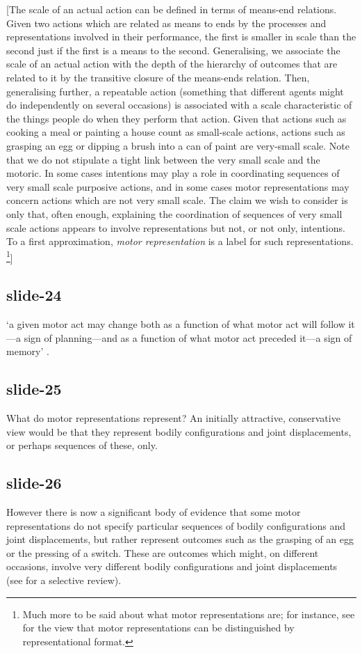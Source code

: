 \documentclass[12pt,\papersize]{extarticle}
\begin{document}
[The scale of an actual action can be defined in terms of means-end relations.
Given two actions which are related as means to ends by the processes and representations
involved in their performance, the first is smaller in scale than the second just if the
first is a means to the second. Generalising, we associate the scale of an actual action
with the depth of the hierarchy of outcomes that are related to it by the transitive closure
of the means-ends relation. Then, generalising further, a repeatable action (something that
different agents might do independently on several occasions) is associated with a scale
characteristic of the things people do when they perform that action. Given that actions
such as cooking a meal or painting a house count as small-scale actions, actions such as
grasping an egg or dipping a brush into a can of paint are very-small scale. Note that we
do not stipulate a tight link between the very small scale and the motoric. In some cases
intentions may play a role in coordinating sequences of very small scale purposive actions,
and in some cases motor representations may concern actions which are not very small scale.
The claim we wish to consider is only that, often enough, explaining the coordination of
sequences of very small scale actions appears to involve representations but not, or not
only, intentions. To a first approximation, \emph{motor representation} is a label for
such representations.%
\footnote{%
Much more to be said about what motor representations are; for instance, see \citet{butterfill:2012_intention} for the view that motor representations can be distinguished by representational format.
}]
 
\subsection{slide-24}
‘a given motor act may change both as a function of what motor act will follow it—a sign of
planning—and as a function of what motor act preceded it—a sign
of memory’ \citep[p.~294]{cohen:2004_wherea}.
 
\subsection{slide-25}
What do motor representations represent? An initially attractive, conservative
view would be that they represent bodily configurations and joint displacements,
or perhaps sequences of these, only.
 
\subsection{slide-26}
However there is now a significant body of evidence that some motor representations
do not specify particular sequences of bodily configurations and joint displacements,
but rather represent outcomes such as the grasping of an egg or the pressing of a switch.
These are outcomes which might, on different occasions, involve very different bodily
configurations and joint displacements
(see \citealp{rizzolatti_functional_2010} for a selective review).
 
\end{document}
